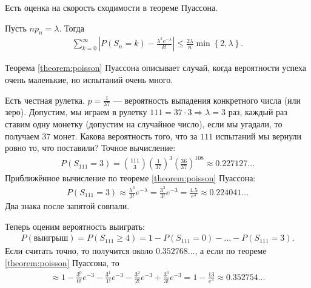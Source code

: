 Есть оценка на скорость сходимости в теореме Пуассона.

\begin{thm}[%
 Прохорова]
 Пусть $np_n = \lambda$. Тогда
 \begin{align*}
  \sum_{k=0}^{\infty} \left| P(S_n = k) - \frac{\lambda^{k}e^{-\lambda}}{k!}\right| \leqslant \frac{2\lambda}{n} \min \left\{ 2, \lambda \right\}.
 \end{align*} 
\end{thm}

Теорема \ref{theorem:poisson} Пуассона описывает случай, когда вероятности успеха очень маленькие, но испытаний очень много.

\begin{exmpl*}
 Есть честная рулетка. $p = \frac{1}{37}$ --- вероятность выпадения конкретного числа (или зеро). Допустим, мы играем в рулетку $111=37\cdot3 \Rightarrow \lambda = 3$ раз, каждый раз ставим одну монетку (допустим на случайное число), если мы угадали, то получаем $37$ монет. Какова вероятность того, что за $111$ испытаний мы вернули ровно то, что поставили? Точное вычисление:
 \begin{align*}
  P(S_{111} = 3) = \binom {111} 3 \left( \frac{1}{37} \right)^{3} \left( \frac{36}{37} \right)^{108} \approx 0.227127\ldots
 \end{align*} Приближённое вычисление по теореме \ref{theorem:poisson} Пуассона:
 \begin{align*}
  P(S_{111} = 3) \approx \frac{\lambda^{3}}{3!}e^{-\lambda} = \frac{3^{3}}{3!} e^{-3} = \frac{4.5}{e^{3}} \approx 0.224041\ldots
 \end{align*} Два знака после запятой совпали.

 Теперь оценим вероятность выиграть:
 \begin{align*}
  P(\text{выигрыш}) = P(S_{111} \geqslant 4) = 1 - P(S_{111} = 0) - \ldots - P(S_{111} = 3)
 .\end{align*} Если считать точно, то получится около $0.352768\ldots$, а если по теореме \ref{theorem:poisson} Пуассона, то
 \begin{align*}
  \approx 1 - \frac{3^{0}}{0!}e^{-3} - \frac{3^{1}}{1!}e^{-3} - \frac{3^{2}}{2!}e^{-3} + \frac{3^{3}}{3!}e^{-3} = 1 - \frac{13}{e^{3}} \approx 0.352754\ldots
 \end{align*} 
\end{exmpl*}

